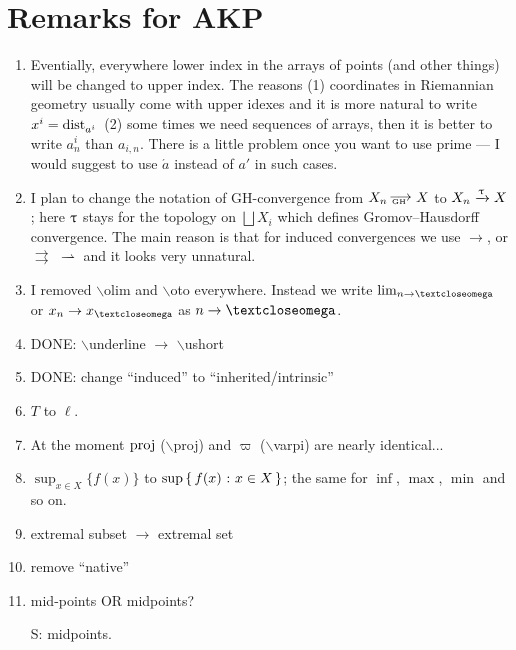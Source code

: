 \chapter{Remarks for AKP}

\begin{enumerate}
\item Eventially, everywhere lower index in the arrays of points (and other things) will be changed to upper index.
The reasons 
(1) coordinates in Riemannian geometry usually come with upper idexes and it is more natural to write $x^i=\mathop{\rm dist}\nolimits_{a^i}^{{}}{}{}$ 
(2) some times we need sequences of arrays, then it is better to write $a^i_n$ than $a_{i,n}$.
There is a little problem once you want to use prime --- I would suggest to use $\acute{a}$ instead of $a'$ in such cases.

\item I plan to change the notation of GH-convergence from $X_n\GHto X$ to $X_n\xrightarrow{\uptau} X$;
here $\uptau$ stays for the topology on $\bigsqcup X_i$ which defines Gromov--Hausdorff convergence. 
The main reason is that for induced convergences we use $\to$, or $\rightrightarrows$ $\rightharpoonup$ and it looks very unnatural. 

\item I removed $\backslash$olim and $\backslash$oto everywhere. Instead we write $\lim_{n\to\o}$ or $x_n\to x_\o$ as $n\to\o$.

\item DONE: $\backslash$underline $\to$ $\backslash$ushort

\item DONE: change ``induced'' to ``inherited/intrinsic''

\item $T$ to $\ell$.

\item At the moment $\mathop{\rm proj}\nolimits$ ($\backslash$proj) and $\varpi{}$ ($\backslash$varpi) are nearly identical...

\item $\sup_{x\in X}\{f(x)\}$ to $\sup\set{f(x)}{x\in X}$;
the same for $\inf$, $\max$, $\min$ and so on.


\item extremal subset $\to$ extremal set

\item remove ``native''

\item mid-points OR midpoints?  

S: midpoints.


\end{enumerate}
